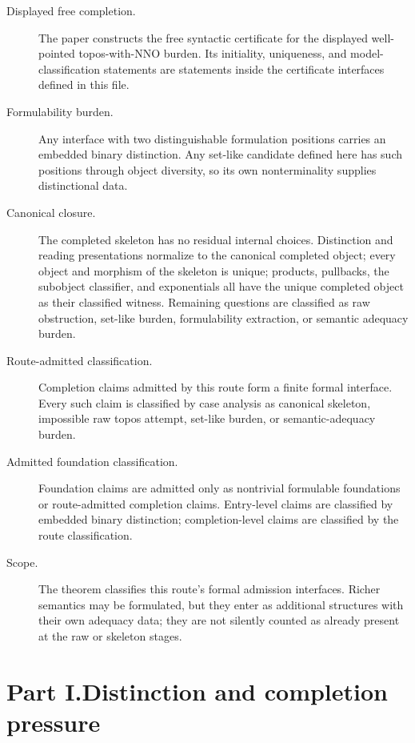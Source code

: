 \documentclass[11pt]{article}
\begin{document}
\begin{description}
\item[Displayed free completion.] The paper constructs the free
syntactic certificate for the displayed well-pointed topos-with-NNO
burden.  Its initiality, uniqueness, and model-classification statements
are statements inside the certificate interfaces defined in this file.

\item[Formulability burden.] Any interface with two distinguishable
formulation positions carries an embedded binary distinction.  Any
set-like candidate defined here has such positions through object
diversity, so its own nonterminality supplies distinctional data.

\item[Canonical closure.] The completed skeleton has no residual
internal choices.  Distinction and reading presentations normalize to
the canonical completed object; every object and morphism of the
skeleton is unique; products, pullbacks, the subobject classifier, and
exponentials all have the unique completed object as their classified
witness.  Remaining questions are classified as raw obstruction,
set-like burden, formulability extraction, or semantic adequacy burden.

\item[Route-admitted classification.] Completion claims admitted by this
route form a finite formal interface.  Every such claim is classified by
case analysis as canonical skeleton, impossible raw topos attempt,
set-like burden, or semantic-adequacy burden.

\item[Admitted foundation classification.] Foundation claims are
admitted only as nontrivial formulable foundations or route-admitted
completion claims.  Entry-level claims are classified by embedded binary
distinction; completion-level claims are classified by the route
classification.

\item[Scope.] The theorem classifies this route's formal admission
interfaces.  Richer semantics may be formulated, but they enter as
additional structures with their own adequacy data; they are not silently
counted as already present at the raw or skeleton stages.
\end{description}

\part*{Part I.\quad Distinction and completion pressure}
\end{document}
